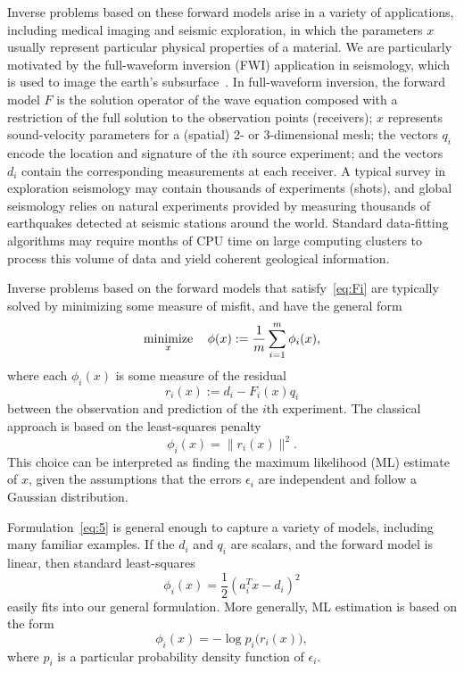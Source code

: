 \documentclass[nospthms]{svjour3}
\numberwithin{equation}{section}
\def\minim{\mathop{\hbox{minimize}}}
\def\minimize#1{\displaystyle\minim_{#1}}
\def\norm#1{\|#1\|}
\def\half{{\textstyle{\frac{1}{2}}}}
\def\T{^T\!}
\begin{document}
Inverse problems based on these forward models arise in a variety of
applications, including medical imaging and seismic exploration, in
which the parameters $x$ usually represent particular physical
properties of a material. We are particularly motivated by the
full-waveform inversion (FWI) application in seismology, which is used
to image the earth's subsurface~\cite{Tarantola1984}.  In
full-waveform inversion, the forward model $F$ is the solution
operator of the wave equation composed with a restriction of the full
solution to the observation points (receivers); $x$ represents
sound-velocity parameters for a (spatial) 2- or 3-dimensional mesh;
the vectors $q_i$ encode the location and signature of the $i$th
source experiment; and the vectors $d_i$ contain the corresponding
measurements at each receiver.  A typical survey in exploration
seismology may contain thousands of experiments (shots), and global
seismology relies on natural experiments provided by measuring
thousands of earthquakes detected at seismic stations around the
world.  Standard data-fitting algorithms may require months of CPU
time on large computing clusters to process this volume of data and
yield coherent geological information.

Inverse problems based on the forward models that
satisfy~\eqref{eq:Fi} are typically solved by minimizing some measure
of misfit, and have the general form
\begin{equation}
  \label{eq:5}
  \minimize{x}\quad \phi(x) := \frac{1}{m}\sum_{i=1}^m \phi_i(x),
\end{equation}
where each $\phi_i(x)$ is some measure of the residual
\begin{equation} \label{eq:2}
 r_i(x) := d_i - F_i(x)q_i
\end{equation}
between the observation and prediction of the $i$th experiment.  The
classical approach is based on the least-squares penalty
\begin{equation}
  \label{eq:15}
  \phi_i(x) = \norm{ r_i(x) }^2.
\end{equation}
This choice can be interpreted as finding the maximum
  likelihood (ML) estimate of $x$, given the
assumptions that the errors $\epsilon_i$ are independent and follow a
Gaussian distribution.

Formulation~\eqref{eq:5} is general enough to capture a variety of models,
including many familiar examples. If the $d_i$ and $q_i$ are
scalars, and the forward model is linear, then standard least-squares
\[
  \phi_i(x) = \half(a_i\T x - d_i)^2
\]
easily fits into our general formulation.
More generally, ML estimation is based on the
form
\begin{equation*}
 \phi_i(x) = -\log p_i\big(r_i(x)\big),
\end{equation*}
where $p_i$ is a particular probability density function of $\epsilon_i$.
\end{document}
